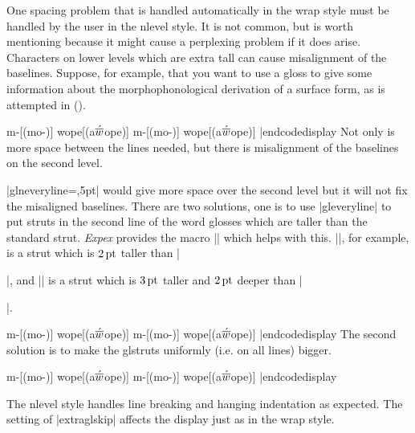 One spacing problem that is handled automatically in the wrap style
must be handled by the user in the nlevel style.  It is not common,
but is worth mentioning because it might cause a perplexing problem if
it does arise.  Characters on lower levels which are extra tall can
cause misalignment of the baselines.  Suppose, for example, that you
want to use a gloss to give some information about the
morphophonological derivation of a surface form, as is attempted
in (\nextx).

\def\AccentedBarredW{$\acute{\hbox{$\overline w$}}$}

\framedisplay
\ex[glstyle=nlevel,glneveryline={\it}]
\begingl m-[(mo-)] wope[(a\AccentedBarredW ope)] \endgl \xe
\endframedisplay
\codedisplay
\ex[glstyle=nlevel,glneveryline={\it}]
\begingl m-[(mo-)] wope[(a\AccentedBarredW ope)] \endgl \xe
|endcodedisplay
Not only is more space between the lines needed, but there is
misalignment of the baselines on the second level.

|glneveryline={,5pt}| would give more space over the second level but
it will not fix the misaligned baselines. There are two solutions,
one is to use |gleveryline| to put struts in the second line of the
word glosses which are taller than the standard strut.  {\it Expex}
provides the macro |\varstrut| which helps with this.
|\varstrut{2pt}|, for example, is a strut which is $2\,\rm pt$ taller
than |\strut|, and |\varstrut{3pt 2pt}| is a strut which is $3\,\rm
pt$ taller and $2\,\rm pt$ deeper than |\strut|.

\framedisplay
\ex[glstyle=nlevel,glneveryline={\it,\varstrut{4pt}}]
\begingl m-[(mo-)] wope[(a\AccentedBarredW ope)] \endgl \xe
\endframedisplay
\codedisplay
\ex[glstyle=nlevel,glneveryline={\it,\varstrut{4pt}}]
\begingl m-[(mo-)] wope[(a\AccentedBarredW ope)] \endgl \xe
|endcodedisplay
The second solution is to make the glstruts uniformly (i.e. on all
lines) bigger.

\framedisplay
\ex[glstyle=nlevel,extraglstrut=4pt 0pt]
\begingl m-[(mo-)] wope[(a\AccentedBarredW ope)] \endgl \xe
\endframedisplay
\codedisplay
\ex[glstyle=nlevel,extraglstrut=4pt 0pt]
\begingl m-[(mo-)] wope[(a\AccentedBarredW ope)] \endgl \xe
|endcodedisplay

The nlevel style handles line breaking and hanging indentation as
expected.  The setting of |extraglskip| affects the display just as in
the wrap style.

